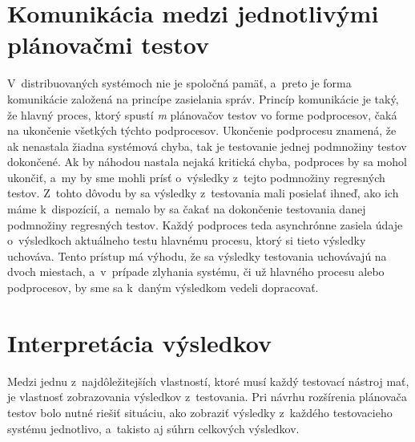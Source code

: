 \section{Komunikácia medzi jednotlivými plánovačmi testov}
\label{sekcia:komunikacia}
V~distribuovaných systémoch nie je spoločná pamäť, a~preto je forma 
komunikácie založená na princípe zasielania správ.
Princíp komunikácie je taký, že hlavný proces, ktorý spustí \emph{m} 
plánovačov testov vo forme podprocesov, čaká na ukončenie
všetkých týchto podprocesov. Ukončenie podprocesu znamená, že ak 
nenastala žiadna systémová chyba, tak je testovanie jednej podmnožiny 
testov dokončené. Ak by náhodou nastala nejaká kritická chyba, 
podproces by sa mohol ukončiť, a~my by sme mohli prísť o~výsledky 
z~tejto podmnožiny regresných testov. Z~tohto dôvodu by sa výsledky 
z~testovania mali posielať ihneď, ako ich máme k~dispozícií,
a~nemalo by sa čakať na dokončenie testovania danej podmnožiny 
regresných testov. Každý podproces teda asynchrónne zasiela údaje 
o~výsledkoch aktuálneho testu hlavnému procesu, ktorý si tieto výsledky 
uchováva. Tento prístup má výhodu, že sa výsledky testovania uchovávajú 
na dvoch miestach, a~v~prípade zlyhania systému, či už hlavného procesu 
alebo podprocesov, by sme sa k~daným výsledkom vedeli dopracovať. 


\section{Interpretácia výsledkov}
\label{sekcia:interpretacia_vysledkov}
Medzi jednu z~najdôležitejších vlastností, ktoré musí každý testovací 
nástroj mať, je vlastnosť zobrazovania výsledkov z~testovania.
Pri návrhu rozšírenia plánovača testov bolo nutné riešiť situáciu, 
ako zobraziť výsledky z~každého testovacieho systému jednotlivo,
a~takisto aj súhrn celkových výsledkov. 

